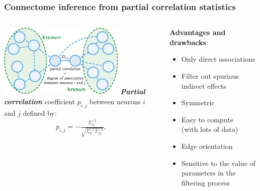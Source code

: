 \documentclass[final]{beamer}
\newcommand{\cmark}{\ding{51}}%
\newcommand{\xmark}{\ding{55}}%
\begin{document}
\begin{frame}

\frametitle{Connectome \textbf{inference} from {\color{red} partial correlation statistics}}

\begin{columns}
\begin{column}{0.55\linewidth}

\includegraphics[width=6cm]{images/network.pdf}
\vspace{10pt}
\textbf{\textit{Partial correlation}} coefficient $p_{i,j}$ between neurons $i$ and $j$ defined by:
\begin{align*}
p_{i,j} =
-\frac{\Sigma^{-1}_{ij}}{\sqrt{\Sigma^{-1}_{ii} \Sigma^{-1}_{jj}}}, \label{eq:inverse}
\end{align*}

\end{column}

\begin{column}{0.45\linewidth}


\textbf{Advantages and drawbacks}:
\begin{itemize}
\item[{\color{green} \cmark}] Only direct associations
\item[{\color{green} \cmark}] Filter out spurious indirect effects
\item[{\color{green} \cmark}] Symmetric 
\item[{\color{green} \cmark}] Easy to compute \\ (with lots of data) \\[2ex]
\item[{\color{red} \xmark}] Edge orientation
\item[{\color{red} \xmark}] Sensitive to the value of parameters in the filtering process
\end{itemize}



\end{column}

\end{columns}

\end{frame}
\end{document}
